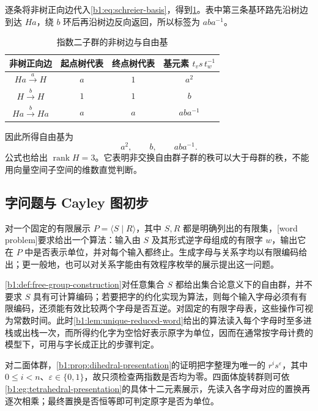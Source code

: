 \ProseParagraphBreak
逐条将非树正向边代入\eqref{b1:eq:schreier-basis}，得到\cref{b1:tab:schreier-index-two-basis}。表中第三条基环路先沿树边到达 \(Ha\)，绕 \(b\) 环后再沿树边反向返回，所以标签为 \(aba^{-1}\)。

\begin{table}[htbp]
	\centering
	\caption{指数二子群的非树边与自由基}
	\label{b1:tab:schreier-index-two-basis}
	\begin{tabular}{@{}cccc@{}}
		\toprule
		非树正向边 & 起点树代表 & 终点树代表 & 基元素 \(t_vs\,t_w^{-1}\) \\
		\midrule
		\(Ha\xrightarrow{a}H\) & \(a\) & \(1\) & \(a^2\) \\
		\(H\xrightarrow{b}H\) & \(1\) & \(1\) & \(b\) \\
		\(Ha\xrightarrow{b}Ha\) & \(a\) & \(a\) & \(aba^{-1}\) \\
		\bottomrule
	\end{tabular}
\end{table}

因此所得自由基为
\[
	a^2,\qquad b,\qquad aba^{-1}.
\]
公式也给出 \(\operatorname{rank}H=3\)。它表明非交换自由群子群的秩可以大于母群的秩，不能用向量空间子空间的维数直觉判断。

\subsection{字问题与 Cayley 图初步}
\label{b1:subsec:0804:03}

对一个固定的有限展示 \(P=\langle S\mid R\rangle\)，其中 \(S,R\) 都是明确列出的有限集，[word problem]要求给出一个算法：输入由 \(S\) 及其形式逆字母组成的有限字 \(w\)，输出它在 \(P\) 中是否表示单位，并对每个输入都终止。生成字母与关系字均以有限编码给出；更一般地，也可以对关系字能由有效程序枚举的展示提出这一问题。

\ProseParagraphBreak
\cref{b1:def:free-group-construction}对任意集合 \(S\) 都给出集合论意义下的自由群，并不要求 \(S\) 具有可计算编码；若要把字的约化实现为算法，则每个输入字母必须有有限编码，还须能有效比较两个字母是否互逆。对固定的有限字母表，这些操作可视为常数时间。此时\cref{b1:lem:unique-reduced-word}给出的算法读入每个字母时至多进栈或出栈一次，而所得约化字为空恰好表示原字为单位，因而在通常按字母计费的模型下，可用与字长成正比的步骤判定。

\ProseParagraphBreak
对二面体群，\cref{b1:prop:dihedral-presentation}的证明把字整理为唯一的 \(r^is^\varepsilon\)，其中 \(0\le i<n\)、\(\varepsilon\in\{0,1\}\)，故只须检查两指数是否均为零。四面体旋转群则可依\cref{b1:eg:tetrahedral-presentation}的具体十二元素展示，先读入各字母对应的置换再逐次相乘；最终置换是否恒等即可判定原字是否为单位。

